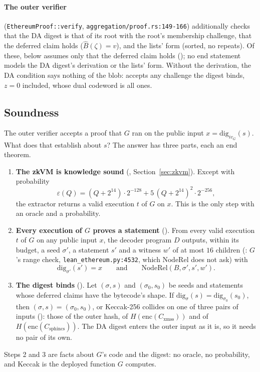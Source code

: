 \documentclass[11pt]{article}
\newcommand{\Cx}{C_{\mathrm{xmss}}}
\newcommand{\Cs}{C_{\mathrm{sphincs}}}
\newcommand{\enc}{\mathrm{enc}}
\begin{document}
\paragraph{The outer verifier} (\texttt{EthereumProof::verify}, \texttt{aggregation/proof.rs:149-166})
additionally checks that the DA digest is that of its root with the root's membership
challenge, that the deferred claim holds ($\widehat{B}(\zeta) = v$), and the lists' form
(sorted, no repeats). Of these,  below
assumes only that the deferred claim holds (); no end statement
models the DA digest's derivation or the lists' form. Without the derivation, the DA condition says
nothing of the blob:  accepts any challenge the digest binds, $z = 0$
included, whose dual codeword is all ones.

\subsection{Soundness}

The outer verifier accepts a proof that $G$ ran on the public input $x = \mathrm{dig}_{iv_G}(s)$.
What does that establish about $s$? The answer has three parts, each an end theorem.
\begin{enumerate}
\item \textbf{The zkVM is knowledge sound} (,
Section~\ref{sec:zkvm}). Except with probability
\[
\varepsilon(Q) = (Q+2^{14})\cdot 2^{-128} + 5\,(Q+2^{14})^2\cdot 2^{-256},
\]
the extractor returns a valid execution $t$ of $G$ on $x$. This is the only step with an oracle
and a probability.
\item \textbf{Every execution of $G$ proves a statement} (). From
every valid execution $t$ of $G$ on any public input $x$, the decoder program $D$ outputs, within
its budget, a seed $\sigma'$, a statement $s'$ and a witness $w'$ of at most $16$ children
(: $G$'s range check, \texttt{lean\_ethereum.py:4532}, which
$\mathrm{NodeRel}$ does not ask) with
\[
\mathrm{dig}_{\sigma'}(s') = x \qquad\text{and}\qquad \mathrm{NodeRel}(B, \sigma', s', w').
\]
\item \textbf{The digest binds} (). Let $(\sigma, s)$ and $(\sigma_0, s_0)$
be seeds and statements whose deferred claims have the bytecode's shape. If
$\mathrm{dig}_\sigma(s) = \mathrm{dig}_{\sigma_0}(s_0)$, then $(\sigma, s) = (\sigma_0, s_0)$, or
Keccak-256 collides on one of three pairs of inputs (): those of the
outer hash, of $H(\enc(\Cx))$ and of $H(\enc(\Cs))$. The DA digest enters the outer input as it
is, so it needs no pair of its own.
\end{enumerate}
Steps 2 and 3 are facts about $G$'s code and the digest: no oracle, no probability, and Keccak is
the deployed function $G$ computes.
\end{document}
